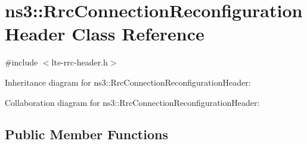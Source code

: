 \hypertarget{classns3_1_1RrcConnectionReconfigurationHeader}{}\section{ns3\+:\+:Rrc\+Connection\+Reconfiguration\+Header Class Reference}
\label{classns3_1_1RrcConnectionReconfigurationHeader}


{\ttfamily \#include $<$lte-\/rrc-\/header.\+h$>$}



Inheritance diagram for ns3\+:\+:Rrc\+Connection\+Reconfiguration\+Header\+:


Collaboration diagram for ns3\+:\+:Rrc\+Connection\+Reconfiguration\+Header\+:
\subsection*{Public Member Functions}
